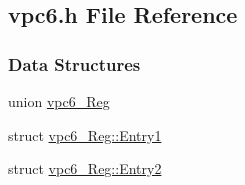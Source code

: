 \subsection{vpc6.h File Reference}
\label{vpc6_8h}
\subsubsection*{Data Structures}
\begin{DoxyCompactItemize}
\item 
union \hyperlink{unionvpc6__Reg}{vpc6\_\-Reg}
\item 
struct \hyperlink{structvpc6__Reg_1_1Entry1}{vpc6\_\-Reg::Entry1}
\item 
struct \hyperlink{structvpc6__Reg_1_1Entry2}{vpc6\_\-Reg::Entry2}
\end{DoxyCompactItemize}

